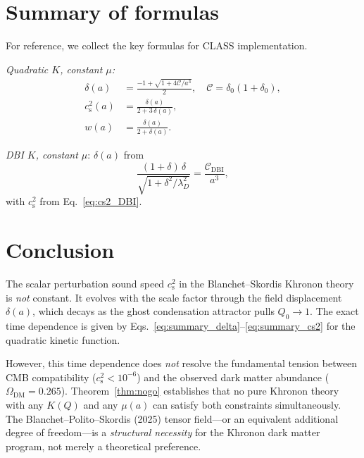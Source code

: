 \documentclass[prd,twocolumn,superscriptaddress,longbibliography,floatfix]{revtex4-2}
\newcommand{\cs}{c_{\mathrm{s}}}
\begin{document}
\section{Summary of formulas}
\label{sec:formulas}

For reference, we collect the key formulas for
CLASS implementation.

\emph{Quadratic $K$, constant $\mu$:}
\begin{align}
\delta(a) &= \frac{-1 + \sqrt{1 + 4\mathcal{C}/a^3}}{2},
\quad \mathcal{C} = \delta_0(1{+}\delta_0),
\label{eq:summary_delta}\\[4pt]
\cs^2(a) &= \frac{\delta(a)}{2 + 3\,\delta(a)},
\label{eq:summary_cs2}\\[4pt]
w(a) &= \frac{\delta(a)}{2 + \delta(a)}.
\label{eq:summary_w}
\end{align}

\emph{DBI $K$, constant $\mu$}: $\delta(a)$ from
\begin{equation}
\frac{(1{+}\delta)\,\delta}{\sqrt{1+\delta^2/\lambda_D^2}}
= \frac{\mathcal{C}_{\mathrm{DBI}}}{a^3},
\label{eq:summary_delta_DBI}
\end{equation}
with $\cs^2$ from Eq.~\eqref{eq:cs2_DBI}.


\section{Conclusion}
\label{sec:conclusion}

The scalar perturbation sound speed $\cs^2$ in the
Blanchet--Skordis Khronon theory is \emph{not} constant.
It evolves with the scale factor through the field
displacement $\delta(a)$, which decays as the ghost
condensation attractor pulls $Q_0 \to 1$.  The exact
time dependence is given by
Eqs.~\eqref{eq:summary_delta}--\eqref{eq:summary_cs2}
for the quadratic kinetic function.

However, this time dependence does \emph{not} resolve
the fundamental tension between CMB compatibility
($\cs^2 < 10^{-6}$) and the observed dark matter
abundance ($\Omega_{\mathrm{DM}} = 0.265$).
Theorem~\ref{thm:nogo} establishes that no pure
Khronon theory with any $K(Q)$ and any $\mu(a)$ can
satisfy both constraints simultaneously.  The
Blanchet--Polito--Skordis (2025) tensor field---or an
equivalent additional degree of freedom---is a
\emph{structural necessity} for the Khronon dark
matter program, not merely a theoretical preference.
\end{document}
